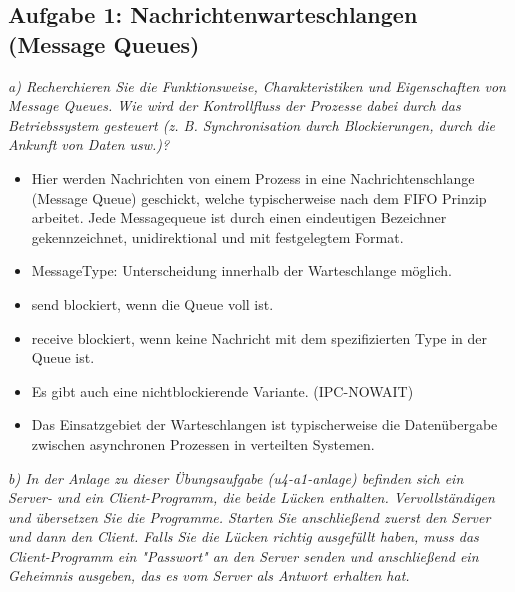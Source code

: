 \documentclass[a4paper]{article}
\begin{document}
\subsection{Aufgabe 1: Nachrichtenwarteschlangen (Message Queues)}
\textit{a) Recherchieren Sie die Funktionsweise, Charakteristiken und Eigenschaften von Message Queues. Wie wird der Kontrollfluss der Prozesse dabei durch das Betriebssystem gesteuert (z. B. Synchronisation durch Blockierungen, durch die Ankunft von Daten usw.)?}
\vspace{10mm}
\begin{itemize}
    \item Hier werden Nachrichten von einem Prozess in eine Nachrichtenschlange (Message Queue) geschickt, welche typischerweise nach dem FIFO Prinzip arbeitet. Jede Messagequeue ist durch einen eindeutigen Bezeichner gekennzeichnet, unidirektional und mit festgelegtem Format.
    \item MessageType: Unterscheidung innerhalb der Warteschlange möglich.
    \item send blockiert, wenn die Queue voll ist.
    \item receive blockiert, wenn keine Nachricht mit dem spezifizierten Type in der Queue ist.
    \item Es gibt auch eine nichtblockierende Variante. (IPC-NOWAIT)
    \item Das Einsatzgebiet der Warteschlangen ist typischerweise die Datenübergabe zwischen asynchronen Prozessen in verteilten Systemen.
\end{itemize}

\textit{b) In der Anlage zu dieser Übungsaufgabe (u4-a1-anlage) befinden sich ein Server- und ein Client-Programm, die beide Lücken enthalten. Vervollständigen und übersetzen Sie die Programme. Starten Sie anschließend zuerst den Server und dann den Client. Falls Sie die Lücken richtig ausgefüllt haben, muss das Client-Programm ein "Passwort" an den Server senden und anschließend ein Geheimnis ausgeben, das es vom Server als Antwort erhalten hat.}
\vspace{10mm}

\end{document}
